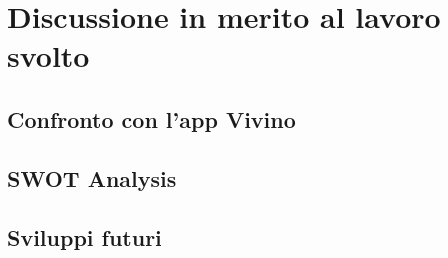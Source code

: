 \chapter{Discussione in merito al lavoro svolto}

\begin{preamble}
{\em

}
\end{preamble}


\section{Confronto con l'app Vivino}
\section{SWOT Analysis}
\section{Sviluppi futuri}

